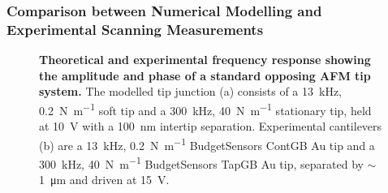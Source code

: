 \documentclass{article}
\begin{document}
\subsubsection{Comparison between Numerical Modelling and Experimental Scanning Measurements}

\begin{figure}[bt]
\centering
{}
\caption[Theoretical and experimental frequency response showing the amplitude and phase of a standard opposing AFM tip system]{\textbf{Theoretical and experimental frequency response showing the amplitude and phase of a standard opposing AFM tip system.} The modelled tip junction (a) consists of a \SI{13}{kHz}, \SI{0.2}{N.m^{-1}} soft tip and a \SI{300}{kHz}, \SI{40}{N.m^{-1}} stationary tip, held at \SI{10}{V} with a \SI{100}{nm} intertip separation. Experimental cantilevers (b) are a \SI{13}{kHz}, \SI{0.2}{N.m^{-1}} BudgetSensors ContGB Au tip and a \SI{300}{kHz}, \SI{40}{N.m^{-1}} BudgetSensors TapGB Au tip, separated by $\sim$\SI{1}{\micro\metre} and driven at \SI{15}{V}.}
\label{fig:frequency_response}
\end{figure}
\end{document}
